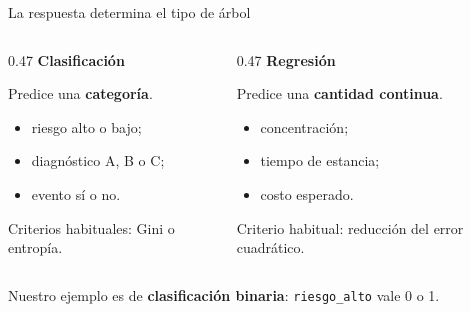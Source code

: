 \documentclass[aspectratio=169,11pt]{beamer}
\newcommand{\framesource}{}
\newcommand{\source}[1]{%
  \gdef\framesource{Fuente: #1}%
}
\begin{document}
\begin{frame}{La respuesta determina el tipo de árbol}
  \vspace{0.35cm}
  \begin{columns}[T,onlytextwidth]
    \begin{column}{0.47\textwidth}
      {\color{Petroleo}\Large\bfseries Clasificación}\par
      \vspace{0.2cm}
      Predice una \textbf{categoría}.\par
      \vspace{0.35cm}
      \begin{itemize}
        \item riesgo alto o bajo;
        \item diagnóstico A, B o C;
        \item evento sí o no.
      \end{itemize}
      \vspace{0.25cm}
      \colorbox{Petroleo!8}{\parbox{0.91\linewidth}{Criterios habituales: Gini o entropía.}}
    \end{column}
    \begin{column}{0.47\textwidth}
      {\color{Coral!90!black}\Large\bfseries Regresión}\par
      \vspace{0.2cm}
      Predice una \textbf{cantidad continua}.\par
      \vspace{0.35cm}
      \begin{itemize}
        \item concentración;
        \item tiempo de estancia;
        \item costo esperado.
      \end{itemize}
      \vspace{0.25cm}
      \colorbox{Coral!10}{\parbox{0.91\linewidth}{Criterio habitual: reducción del error cuadrático.}}
    \end{column}
  \end{columns}
  \vfill
  Nuestro ejemplo es de \textbf{clasificación binaria}: \texttt{riesgo\_alto} vale 0 o 1.
  \source{Ma (2018), cap. 3; Breiman et al. (1984).}
\end{frame}
\end{document}
